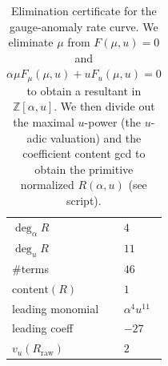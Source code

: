 \begin{table}[H]
\centering
\scriptsize
\setlength{\tabcolsep}{6pt}
\caption{Elimination certificate for the gauge-anomaly rate curve. We eliminate $\mu$ from $F(\mu,u)=0$ and $\alpha\mu F_{\mu}(\mu,u)+uF_u(\mu,u)=0$ to obtain a resultant in $\mathbb{Z}[\alpha,u]$. We then divide out the maximal $u$-power (the $u$-adic valuation) and the coefficient content gcd to obtain the primitive normalized $R(\alpha,u)$ (see script).}
\label{tab:fold_gauge_anomaly_rate_curve_resultant_degree}
\begin{tabular}{l l}
\toprule
$\deg_{\alpha} R$ & $4$\\
$\deg_{u} R$ & $11$\\
\#terms & $46$\\
$\mathrm{content}(R)$ & $1$\\
leading monomial & $\alpha^{4}u^{11}$\\
leading coeff & $-27$\\
$v_u(R_{\mathrm{raw}})$ & $2$\\
\bottomrule
\end{tabular}
\end{table}
